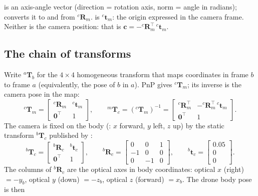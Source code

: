  is an axis-angle vector (direction = rotation axis, norm = angle in radians); 
converts it to and from ${}^c\mathbf R_m$.  is ${}^c\mathbf t_m$: the  origin expressed in the
camera frame. Neither is the camera position: that is $\mathbf c = -{}^c\mathbf R_m^\top\, {}^c\mathbf t_m$.

\subsection{The chain of transforms}

Write ${}^a\mathbf T_b$ for the $4\times 4$ homogeneous transform that maps coordinates in frame $b$ to frame $a$
(equivalently, the pose of $b$ in $a$). PnP gives ${}^c\mathbf T_m$; its inverse is the camera pose in the map:
\begin{equation}
{}^c\mathbf T_m = \begin{bmatrix} {}^c\mathbf R_m & {}^c\mathbf t_m\\ \mathbf 0^\top & 1\end{bmatrix},
\qquad
{}^m\mathbf T_c = ({}^c\mathbf T_m)^{-1} = \begin{bmatrix} {}^c\mathbf R_m^\top & -{}^c\mathbf R_m^\top\,{}^c\mathbf t_m\\
\mathbf 0^\top & 1\end{bmatrix}.
\end{equation}
The camera is fixed on the body (: $x$ forward, $y$ left, $z$ up) by the static transform
${}^b\mathbf T_c$ published by :
\begin{equation}
{}^b\mathbf T_c = \begin{bmatrix} {}^b\mathbf R_c & {}^b\mathbf t_c\\ \mathbf 0^\top & 1\end{bmatrix},\qquad
{}^b\mathbf R_c = \begin{bmatrix} 0&0&1\\ -1&0&0\\ 0&-1&0\end{bmatrix},\qquad
{}^b\mathbf t_c = \begin{bmatrix}0.05\\0\\0\end{bmatrix}.
\label{eq:mount}
\end{equation}
The columns of ${}^b\mathbf R_c$ are the optical axes in body coordinates: optical $x$ (right) $=-y_b$, optical $y$
(down) $=-z_b$, optical $z$ (forward) $=x_b$. The drone body pose is then
